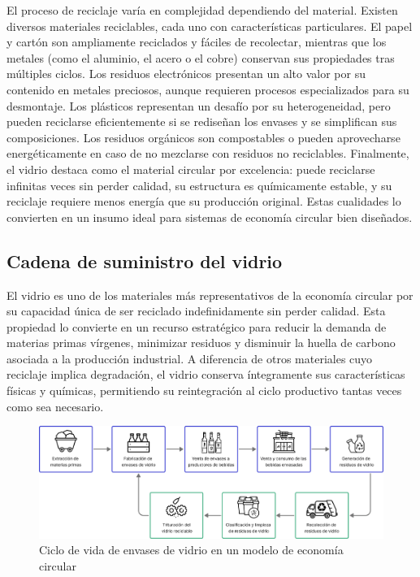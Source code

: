 El proceso de reciclaje varía en complejidad dependiendo del material. Existen diversos materiales reciclables, cada uno con características particulares. El papel y cartón son ampliamente reciclados y fáciles de recolectar, mientras que los metales (como el aluminio, el acero o el cobre) conservan sus propiedades tras múltiples ciclos. Los residuos electrónicos presentan un alto valor por su contenido en metales preciosos, aunque requieren procesos especializados para su desmontaje. Los plásticos representan un desafío por su heterogeneidad, pero pueden reciclarse eficientemente si se rediseñan los envases y se simplifican sus composiciones. Los residuos orgánicos son compostables o pueden aprovecharse energéticamente en caso de no mezclarse con residuos no reciclables. Finalmente, el vidrio destaca como el material circular por excelencia: puede reciclarse infinitas veces sin perder calidad, su estructura es químicamente estable, y su reciclaje requiere menos energía que su producción original. Estas cualidades lo convierten en un insumo ideal para sistemas de economía circular bien diseñados.

\subsection{Cadena de suministro del vidrio}
\label{sec:glass-supply-chain}

El vidrio es uno de los materiales más representativos de la economía circular por su capacidad única de ser reciclado indefinidamente sin perder calidad. Esta propiedad lo convierte en un recurso estratégico para reducir la demanda de materias primas vírgenes, minimizar residuos y disminuir la huella de carbono asociada a la producción industrial. A diferencia de otros materiales cuyo reciclaje implica degradación, el vidrio conserva íntegramente sus características físicas y químicas, permitiendo su reintegración al ciclo productivo tantas veces como sea necesario.

\begin{figure}[!htb]
    \centering
    \includegraphics[width=\textwidth]{Figures/glass-lifecycle.png}
    \caption{Ciclo de vida de envases de vidrio en un modelo de economía circular}
    \label{fig:glass-lifecycle}
\end{figure}

